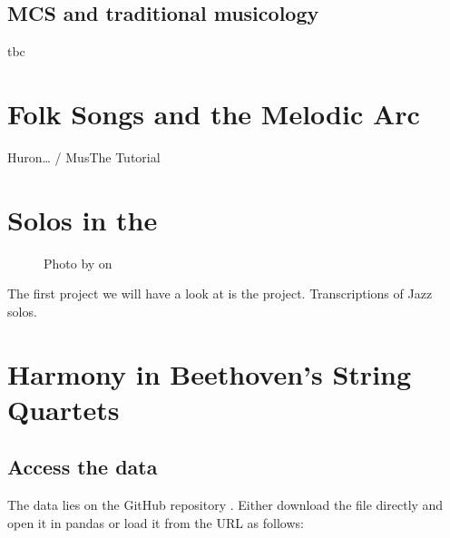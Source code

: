 \documentclass[letterpaper,10pt,english]{sphinxmanual}
\begin{document}
\section{MCS and traditional musicology}
\label{\detokenize{background:mcs-and-traditional-musicology}}
tbc


\chapter{Folk Songs and the Melodic Arc}
\label{\detokenize{folk_songs:folk-songs-and-the-melodic-arc}}\label{\detokenize{folk_songs::doc}}
Huron… / MusThe Tutorial


\chapter{Solos in the }
\label{\detokenize{jazz_solos:solos-in-the-weimar-jazz-database}}\label{\detokenize{jazz_solos::doc}}
\begin{figure}[htbp]
\centering
\capstart

\noindent{}
\caption{Photo by 
on }\label{\detokenize{jazz_solos:id2}}\end{figure}

The first project we will have a look at is the  project.
Transcriptions of Jazz solos. 


\chapter{Harmony in Beethoven’s String Quartets}
\label{\detokenize{beethoven_harmony:harmony-in-beethoven-s-string-quartets}}\label{\detokenize{beethoven_harmony::doc}}

\section{Access the data}
\label{\detokenize{beethoven_harmony:access-the-data}}
The data lies on the GitHub repository .
Either download the  file directly and open it in pandas or load it from the URL as follows:
\end{document}
